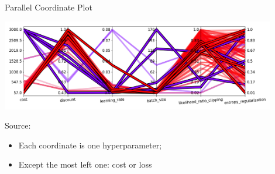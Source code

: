 \begin{frame}[c]{Parallel Coordinate Plot }

\centering
\includegraphics[width=0.9\textwidth]{images/parallel_coordinates_linear_cost_log_sampling_100}
\begin{flushright}
	Source:  
\end{flushright}

\begin{itemize}
	\item Each coordinate is one hyperparameter; 
	\item Except the most left one: cost or loss
\end{itemize}

\end{frame}
